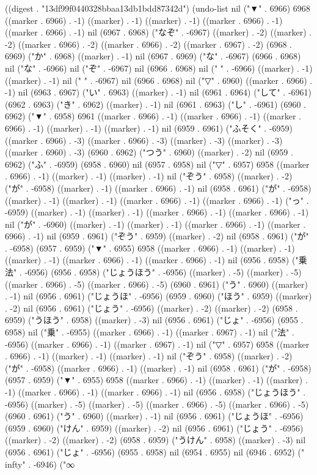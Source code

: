 
((digest . "13df99f0440328bbaa13db1bdd87342d") (undo-list nil ("▼" . 6966) 6968 ((marker . 6966) . -1) ((marker) . -1) ((marker) . -1) ((marker . 6966) . -1) ((marker . 6966) . -1) nil (6967 . 6968) ("なぞ" . -6967) ((marker) . -2) ((marker) . -2) ((marker . 6966) . -2) ((marker . 6966) . -2) ((marker . 6967) . -2) (6968 . 6969) ("か" . 6968) ((marker) . -1) nil (6967 . 6969) ("な" . -6967) (6966 . 6968) nil ("な" . -6966) nil ("ぞ" . -6967) nil (6966 . 6968) nil ("
" . -6966) ((marker) . -1) ((marker) . -1) nil (" " . -6967) nil (6966 . 6968) nil ("▽" . 6960) ((marker . 6966) . -1) nil (6963 . 6967) ("い" . 6963) ((marker) . -1) nil (6961 . 6964) ("して" . -6961) (6962 . 6963) ("き" . 6962) ((marker) . -1) nil (6961 . 6963) ("し" . -6961) (6960 . 6962) ("▼" . 6958) 6961 ((marker . 6966) . -1) ((marker . 6966) . -1) ((marker . 6966) . -1) ((marker) . -1) ((marker) . -1) nil (6959 . 6961) ("ふそく" . -6959) ((marker . 6966) . -3) ((marker . 6966) . -3) ((marker) . -3) ((marker) . -3) ((marker . 6960) . -3) (6960 . 6962) ("つう" . 6960) ((marker) . -2) nil (6959 . 6962) ("ふ" . -6959) (6958 . 6960) nil (6957 . 6958) nil ("▽" . 6957) 6958 ((marker . 6966) . -1) ((marker) . -1) ((marker) . -1) nil ("ぞう" . 6958) ((marker) . -2) ("が" . -6958) ((marker) . -1) ((marker . 6966) . -1) nil (6958 . 6961) ("が" . -6958) ((marker) . -1) ((marker) . -1) ((marker . 6966) . -1) ((marker . 6966) . -1) ("っ" . -6959) ((marker) . -1) ((marker) . -1) ((marker . 6966) . -1) ((marker . 6966) . -1) nil ("が" . -6960) ((marker) . -1) ((marker) . -1) ((marker . 6966) . -1) ((marker . 6966) . -1) nil (6959 . 6961) ("ぞう" . 6959) ((marker) . -2) nil (6958 . 6961) ("が" . -6958) (6957 . 6959) ("▼" . 6955) 6958 ((marker . 6966) . -1) ((marker) . -1) ((marker) . -1) ((marker . 6966) . -1) ((marker . 6966) . -1) nil (6956 . 6958) ("乗法" . -6956) (6956 . 6958) ("じょうほう" . -6956) ((marker) . -5) ((marker) . -5) ((marker . 6966) . -5) ((marker . 6966) . -5) (6960 . 6961) ("う" . 6960) ((marker) . -1) nil (6956 . 6961) ("じょうほ" . -6956) (6959 . 6960) ("ほう" . 6959) ((marker) . -2) nil (6956 . 6961) ("じょう" . -6956) ((marker) . -2) ((marker) . -2) (6958 . 6959) ("うほう" . 6958) ((marker) . -3) nil (6956 . 6961) ("じょ" . -6956) (6955 . 6958) nil ("乗" . -6955) ((marker . 6966) . -1) ((marker . 6967) . -1) nil ("法" . -6956) ((marker . 6966) . -1) ((marker . 6967) . -1) nil ("▽" . 6957) 6958 ((marker . 6966) . -1) ((marker) . -1) ((marker) . -1) nil ("ぞう" . 6958) ((marker) . -2) ("が" . -6958) ((marker . 6966) . -1) ((marker) . -1) nil (6958 . 6961) ("が" . -6958) (6957 . 6959) ("▼" . 6955) 6958 ((marker . 6966) . -1) ((marker) . -1) ((marker) . -1) ((marker . 6966) . -1) ((marker . 6966) . -1) nil (6956 . 6958) ("じょうほう" . -6956) ((marker) . -5) ((marker) . -5) ((marker . 6966) . -5) ((marker . 6966) . -5) (6960 . 6961) ("う" . 6960) ((marker) . -1) nil (6956 . 6961) ("じょうほ" . -6956) (6959 . 6960) ("けん" . 6959) ((marker) . -2) nil (6956 . 6961) ("じょう" . -6956) ((marker) . -2) ((marker) . -2) (6958 . 6959) ("うけん" . 6958) ((marker) . -3) nil (6956 . 6961) ("じょ" . -6956) (6955 . 6958) nil (6954 . 6955) nil (6946 . 6952) ("\\infty" . -6946) ("∞
